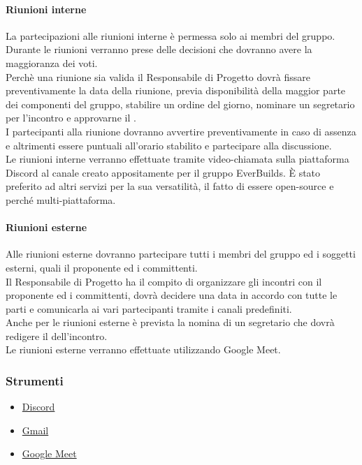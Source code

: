             \paragraph{Riunioni interne}
                La partecipazioni alle riunioni interne è permessa solo ai membri del gruppo.        \\
                Durante le riunioni verranno prese delle decisioni che dovranno avere la maggioranza dei voti.\\
                Perchè una riunione sia valida il Responsabile di Progetto dovrà fissare preventivamente la data della riunione, previa disponibilità della maggior parte dei componenti del gruppo, stabilire un ordine del giorno, nominare un segretario per l’incontro e approvarne il .\\
                I partecipanti alla riunione dovranno avvertire preventivamente in caso di assenza e altrimenti essere puntuali all’orario stabilito e partecipare alla discussione.\\
                Le riunioni interne verranno effettuate tramite video-chiamata sulla piattaforma Discord al canale creato appositamente per il gruppo EverBuilds. È stato preferito ad altri servizi per la sua versatilità, il fatto di essere open-source e perché multi-piattaforma.\\
            \paragraph{Riunioni esterne}
                Alle riunioni esterne dovranno partecipare tutti i membri del gruppo ed i soggetti esterni, quali il proponente ed i committenti.\\
                Il Responsabile di Progetto ha il compito di organizzare gli incontri con il proponente ed i committenti, dovrà decidere una data in accordo con tutte le parti e comunicarla ai vari partecipanti tramite i canali predefiniti.\\
                Anche per le riunioni esterne è prevista la nomina di un segretario che dovrà redigere il  dell’incontro.\\
                Le riunioni esterne verranno effettuate utilizzando Google Meet.\\
        \subsubsection{Strumenti}
            \begin{itemize}
                \item \href{https://discordapp.com/company/}{Discord}
                \item \href{https://www.google.com/intl/it/gmail/about/}{Gmail }
                \item \href{https://meet.google.com/?hs=197\&pli=1\&authuser=0}{Google Meet}
            \end{itemize}
